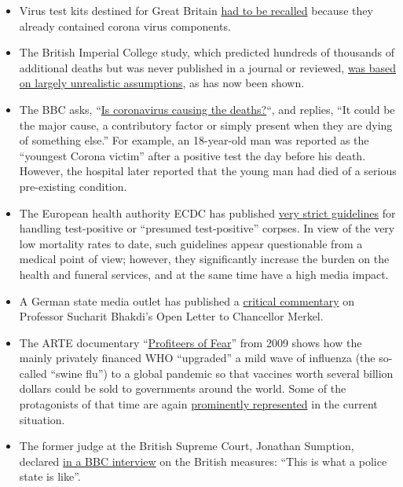 \begin{itemize}
\tightlist
\item
  Virus test kits destined for Great Britain
  \href{https://www.telegraph.co.uk/news/2020/03/30/uks-attempt-ramp-coronavirus-testing-hindered-key-components/}{had
  to be recalled} because they already contained corona virus
  components.
\item
  The British Imperial College study, which predicted hundreds of
  thousands of additional deaths but was never published in a journal or
  reviewed,
  \href{https://judithcurry.com/2020/04/01/imperial-college-uk-covid-19-numbers-dont-seem-to-add-up/}{was
  based on largely unrealistic assumptions}, as has now been shown.
\item
  The BBC asks, ``\href{https://www.bbc.com/news/health-51979654}{Is
  coronavirus causing the deaths?}``, and replies, ``It could be the
  major cause, a contributory factor or simply present when they are
  dying of something else.'' For example, an 18-year-old man was
  reported as the ``youngest Corona victim'' after a positive test the
  day before his death. However, the hospital later reported that the
  young man had died of a serious pre-existing condition.
\item
  The European health authority ECDC has published
  \href{https://www.ecdc.europa.eu/sites/default/files/documents/COVID-19-safe-handling-of-bodies-or-persons-dying-from-COVID19.pdf}{very
  strict guidelines} for handling test-positive or ``presumed
  test-positive'' corpses. In view of the very low mortality rates to
  date, such guidelines appear questionable from a medical point of
  view; however, they significantly increase the burden on the health
  and funeral services, and at the same time have a high media impact.
\item
  A German state media outlet has published a
  \href{https://www.br.de/nachrichten/wissen/bhakdis-brief-an-die-kanzlerin-was-ist-dran-an-seinen-fragen,RutYDhd}{critical
  commentary} on Professor Sucharit Bhakdi's Open Letter to Chancellor
  Merkel.
\item
  The ARTE documentary ``\href{https://vimeo.com/403175258}{Profiteers
  of Fear}'' from 2009 shows how the mainly privately financed WHO
  ``upgraded'' a mild wave of influenza (the so-called ``swine flu'') to
  a global pandemic so that vaccines worth several billion dollars could
  be sold to governments around the world. Some of the protagonists of
  that time are again
  \href{https://www.nature.com/articles/news.2009.424}{prominently
  represented} in the current situation.
\item
  The former judge at the British Supreme Court, Jonathan Sumption,
  declared
  \href{https://www.spectator.co.uk/article/former-supreme-court-justice-this-is-what-a-police-state-is-like-}{in
  a BBC interview} on the British measures: ``This is what a police
  state is like''.
\end{itemize}

